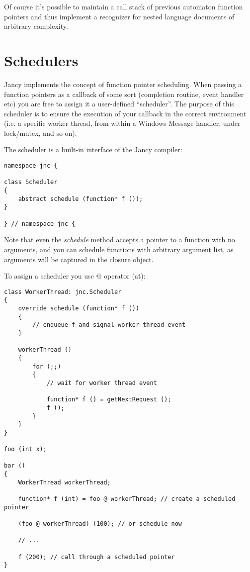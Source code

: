 \documentclass[oneside]{book}
\begin{document}
Of course it's possible to maintain a call stack of previous automaton function pointers and thus implement a recognizer for nested language documents of arbitrary complexity.

\section{Schedulers}

Jancy implements the concept of function pointer scheduling. When passing a function pointers as a callback of some sort (completion routine, event handler etc) you are free to assign it a user-defined “scheduler”. The purpose of this scheduler is to ensure the execution of your callback in the correct environment (i.e. a specific worker thread, from within a Windows Message handler, under lock/mutex, and so on).

The scheduler is a built-in interface of the Jancy compiler:

\begin{lstlisting}
namespace jnc {

class Scheduler
{
    abstract schedule (function* f ());
}

} // namespace jnc {
\end{lstlisting}

Note that even the \emph{schedule} method accepts a pointer to a function with no arguments, and you can schedule functions with arbitrary argument list, as arguments will be captured in the closure object.

To assign a scheduler you use @ operator (at):

\begin{lstlisting}
class WorkerThread: jnc.Scheduler
{
    override schedule (function* f ())
    {
        // enqueue f and signal worker thread event
    }

    workerThread ()
    {
        for (;;)
        {
            // wait for worker thread event

            function* f () = getNextRequest ();
            f ();
        }
    }
}

foo (int x);

bar ()
{
    WorkerThread workerThread;

    function* f (int) = foo @ workerThread; // create a scheduled pointer

    (foo @ workerThread) (100); // or schedule now

    // ...

    f (200); // call through a scheduled pointer
}
\end{lstlisting}
\end{document}
